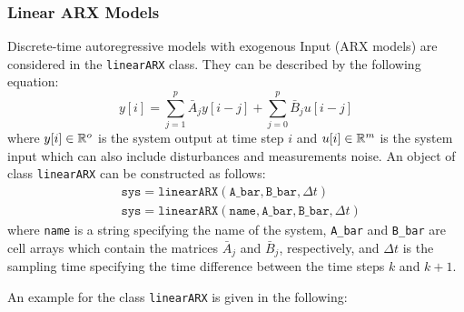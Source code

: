 \subsubsection{Linear ARX Models} \label{sec:linearARX}

Discrete-time autoregressive models with exogenous Input (ARX models) are considered in the \texttt{linearARX} class.
They can be described by the following equation:
\begin{equation}\label{eq:linearARX}
	y[i] = \sum_{j=1}^p \bar{A}_{j} y[i-j] + \sum_{j=0}^p \bar{B}_{j} {u}[i-j]
\end{equation} 
where $y[i] \in \mathbb{R}^o$ is the system output at time step $i$ and $u[i] \in \mathbb{R}^m$ is the system input which can also include disturbances and measurements noise.
An object of class \texttt{linearARX} can be constructed as follows:
\begin{equation*}
	\begin{split}
		&   \texttt{sys} = \texttt{linearARX}(\texttt{A\_{bar}},\texttt{B\_{bar}},\Delta t) \\
		&   \texttt{sys} = \texttt{linearARX}(\texttt{name},\texttt{A\_{bar}},\texttt{B\_{bar}},\Delta t)
	\end{split}
\end{equation*} 
where \texttt{name} is a string specifying the name of the system, \texttt{A\_{bar}} and \texttt{B\_{bar}} are cell arrays which contain the matrices $\bar{A}_{j}$ and $\bar{B}_{j}$, respectively, and $\Delta t$ is the sampling time specifying the time difference between the time steps $k$ and $k+1$.

An example for the class \texttt{linearARX} is given in the following:

